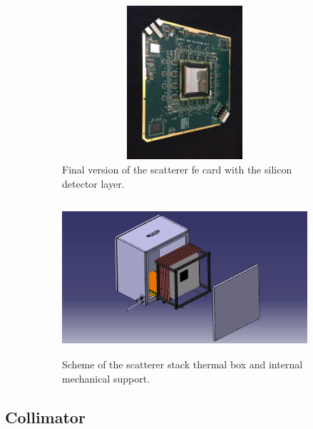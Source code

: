 \begin{figure}
\begin{subfigure}[t]{.5\textwidth}
\centering
\includegraphics[width=1\textwidth, height = 5.7cm]{03_GraphicFiles/chapter3_CLaRySproto/Scatterer/DAQ_card.JPG}
\caption{Final version of the scatterer \gls{fe} card with the silicon detector layer.}
\label{chap3::fig::scattDAQcard}
\end{subfigure}
\begin{subfigure}[t]{.5\textwidth}
\centering
\includegraphics[width=1\textwidth, trim={5cm 0 5cm 0}, clip = true, height = 5.7cm]{03_GraphicFiles/chapter3_CLaRySproto/Scatterer/Rack_cartes_Si_2.jpg}
\caption{Scheme of the scatterer stack thermal box and internal mechanical support.}
\label{chap3::fig::thermalBox}
\end{subfigure}
\caption{}
\label{chap3::fig::scattererCardMech}
\end{figure} 


\subsection{Collimator}\label{chap3::subsec::collimator}
 
